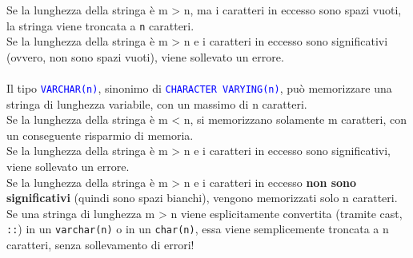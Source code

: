 \documentclass[12pt,a4paper]{book}
\begin{document}
	Se la lunghezza della stringa è m > n, ma i caratteri in eccesso sono spazi vuoti, la stringa viene troncata a \texttt{n} caratteri.\\
	Se la lunghezza della stringa è m > n e i caratteri in eccesso sono significativi (ovvero, non sono spazi vuoti), viene sollevato un errore.\\ \\
	Il tipo \textcolor{blue}{\texttt{VARCHAR(n)}}, sinonimo di \textcolor{blue}{\texttt{CHARACTER VARYING(n)}}, può memorizzare una stringa di lunghezza variabile, con un massimo di n caratteri.\\
	Se la lunghezza della stringa è m < n, si memorizzano solamente m caratteri, con un conseguente risparmio di memoria.\\
	Se la lunghezza della stringa è m > n e i caratteri in eccesso sono significativi, viene sollevato un errore.\\
	Se la lunghezza della stringa è m > n e i caratteri in eccesso \textbf{non sono significativi} (quindi sono spazi bianchi), vengono memorizzati solo n caratteri.\\
	Se una stringa di lunghezza m > n viene esplicitamente convertita (tramite cast, \texttt{::}) in un \texttt{varchar(n)} o in un \texttt{char(n)}, essa viene semplicemente troncata a n caratteri, senza sollevamento di errori! 
\end{document}
